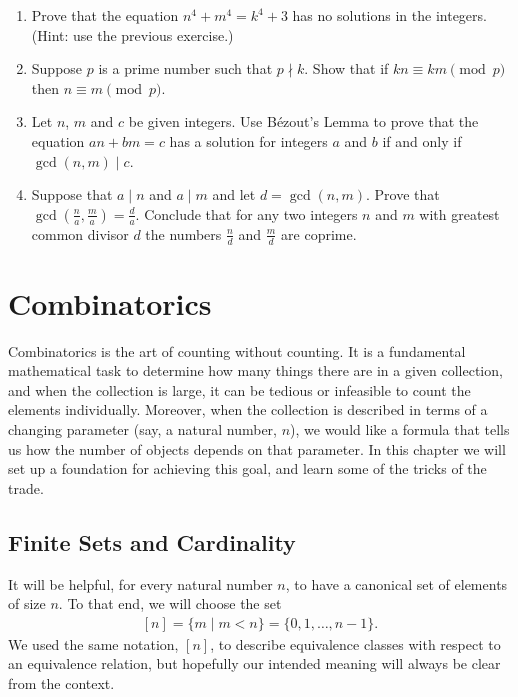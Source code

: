 \documentclass[letterpaper,10pt,english]{sphinxmanual}
\begin{document}
\begin{enumerate}
\item {} 
\sphinxAtStartPar
Prove that the equation \(n^4+m^4=k^4+3\) has no solutions in the integers. (Hint: use the previous exercise.)

\item {} 
\sphinxAtStartPar
Suppose \(p\) is a prime number such that \(p \nmid k\). Show that if \(kn\equiv km \pmod{p}\) then \(n \equiv m \pmod{p}\).

\item {} 
\sphinxAtStartPar
Let \(n\), \(m\) and \(c\) be given integers. Use B‎ézout’s Lemma to prove that the equation \(an+bm=c\) has a solution for integers \(a\) and \(b\) if and only if \(\gcd(n, m) \mid c\).

\item {} 
\sphinxAtStartPar
Suppose that \(a \mid n\) and \(a \mid m\) and let \(d = \gcd(n,m)\). Prove that \(\gcd(\frac na, \frac ma) =\frac da\). Conclude that for any two integers \(n\) and \(m\) with greatest common divisor \(d\) the numbers \(\frac nd\) and \(\frac md\) are coprime.

\end{enumerate}


\chapter{Combinatorics}
\label{\detokenize{combinatorics:combinatorics}}\label{\detokenize{combinatorics:id1}}\label{\detokenize{combinatorics::doc}}
\sphinxAtStartPar
Combinatorics is the art of counting without counting. It is a fundamental mathematical task to determine how many things there are in a given collection, and when the collection is large, it can be tedious or infeasible to count the elements individually. Moreover, when the collection is described in terms of a changing parameter (say, a natural number, \(n\)), we would like a formula that tells us how the number of objects depends on that parameter. In this chapter we will set up a foundation for achieving this goal, and learn some of the tricks of the
trade.


\section{Finite Sets and Cardinality}
\label{\detokenize{combinatorics:finite-sets-and-cardinality}}
\sphinxAtStartPar
It will be helpful, for every natural number \(n\), to have a canonical set of elements of size \(n\). To that end, we will choose the set
\begin{equation*}
\begin{split}[n] = \{ m \mid m < n \} = \{ 0, 1, \ldots, n-1 \}.\end{split}
\end{equation*}
\sphinxAtStartPar
We used the same notation, \([n]\), to describe equivalence classes with respect to an equivalence relation, but hopefully our intended meaning will always be clear from the context.
\end{document}
